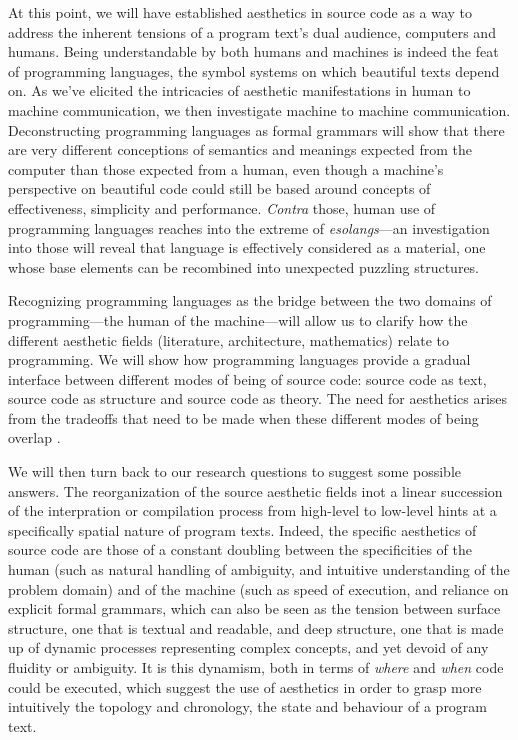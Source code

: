 At this point, we will have established aesthetics in source code as a way to address the inherent tensions of a program text's dual audience, computers and humans. Being understandable by both humans and machines is indeed the feat of programming languages, the symbol systems on which beautiful texts depend on. As we've elicited the intricacies of aesthetic manifestations in human to machine communication, we then investigate machine to machine communication. Deconstructing programming languages as formal grammars will show that there are very different conceptions of semantics and meanings expected from the computer than those expected from a human, even though a machine's perspective on beautiful code could still be based around concepts of effectiveness, simplicity and performance. \emph{Contra} those, human use of programming languages reaches into the extreme of \emph{esolangs}—an investigation into those will reveal that language is effectively considered as a material, one whose base elements can be recombined into unexpected puzzling structures.

Recognizing programming languages as the bridge between the two domains of programming—the human of the machine—will allow us to clarify how the different aesthetic fields (literature, architecture, mathematics) relate to programming. We will show how programming languages provide a gradual interface between different modes of being of source code: source code as text, source code as structure and source code as theory. The need for aesthetics arises from the tradeoffs that need to be made when these different modes of being overlap \citep{simondon_mode_1958}.

We will then turn back to our research questions to suggest some possible answers. The reorganization of the source aesthetic fields inot a linear succession of the interpration or compilation process from high-level to low-level hints at a specifically spatial nature of program texts. Indeed, the specific aesthetics of source code are those of a constant doubling between the specificities of the human (such as natural handling of ambiguity, and intuitive understanding of the problem domain) and of the machine (such as speed of execution, and reliance on explicit formal grammars, which can also be seen as the tension between surface structure, one that is textual and readable, and deep structure, one that is made up of dynamic processes representing complex concepts, and yet devoid of any fluidity or ambiguity. It is this dynamism, both in terms of \emph{where} and \emph{when} code could be executed, which suggest the use of aesthetics in order to grasp more intuitively the topology and chronology, the state and behaviour of a program text.

